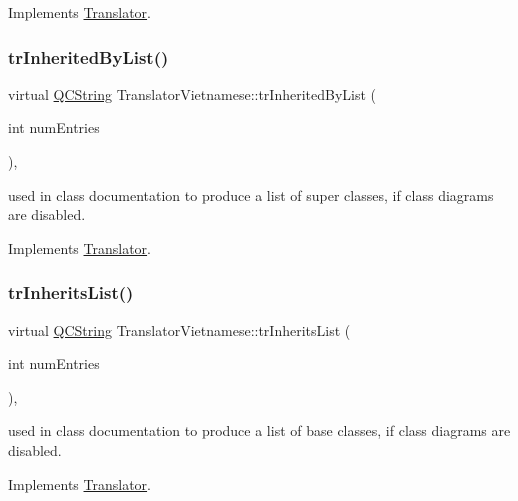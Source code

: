 Implements \mbox{\hyperlink{class_translator}{Translator}}.

\mbox{\label{class_translator_vietnamese_a9825944527da9ee754888c84f7281f96}} 
\subsubsection{\texorpdfstring{trInheritedByList()}{trInheritedByList()}}
{\footnotesize\ttfamily virtual \mbox{\hyperlink{class_q_c_string}{Q\+C\+String}} Translator\+Vietnamese\+::tr\+Inherited\+By\+List (\begin{DoxyParamCaption}\item[{int}]{num\+Entries }\end{DoxyParamCaption})\hspace{0.3cm}{\ttfamily [inline]}, {\ttfamily [virtual]}}

used in class documentation to produce a list of super classes, if class diagrams are disabled. 

Implements \mbox{\hyperlink{class_translator}{Translator}}.

\mbox{\label{class_translator_vietnamese_acebe0baec5bca7de66b2374e7f59fad1}} 
\subsubsection{\texorpdfstring{trInheritsList()}{trInheritsList()}}
{\footnotesize\ttfamily virtual \mbox{\hyperlink{class_q_c_string}{Q\+C\+String}} Translator\+Vietnamese\+::tr\+Inherits\+List (\begin{DoxyParamCaption}\item[{int}]{num\+Entries }\end{DoxyParamCaption})\hspace{0.3cm}{\ttfamily [inline]}, {\ttfamily [virtual]}}

used in class documentation to produce a list of base classes, if class diagrams are disabled. 

Implements \mbox{\hyperlink{class_translator}{Translator}}.

